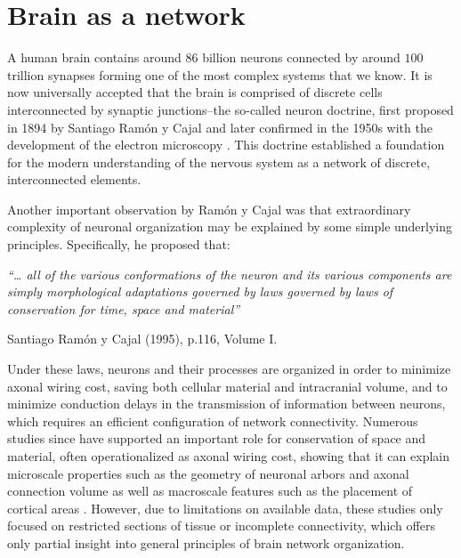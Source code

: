 \section{Brain as a network}
A human brain contains around $86$ billion neurons connected by around $100$ trillion synapses \citep{Williams1988,Andersen1992,Pelvig2008} forming one of the most complex systems that we know. It is now universally accepted that the brain is comprised of discrete cells interconnected by synaptic junctions--the so-called neuron doctrine, first proposed in 1894 by Santiago Ram\'{o}n y Cajal \citep{RamonyCajal1995} and later confirmed in the 1950s with the development of the electron microscopy \citep{DeRobertis1955}. This doctrine established a foundation for the modern understanding of the nervous system as a network of discrete, interconnected elements. 

Another important observation by Ram\'{o}n y Cajal was that extraordinary complexity of neuronal organization may be explained by some simple underlying principles. Specifically, he proposed that: 
\bigskip
\bigskip

\textit{``… all of the various conformations of the neuron and its various components are simply morphological adaptations governed by laws governed by laws of conservation for time, space and material''}

\hspace{7.5cm}Santiago Ram\'{o}n y Cajal (1995), p.116, Volume I. 
\bigskip

Under these laws, neurons and their processes are organized in order to minimize axonal wiring cost, saving both cellular material and intracranial volume, and to minimize conduction delays in the transmission of information between neurons, which requires an efficient configuration of network connectivity. Numerous studies since have supported an important role for conservation of space and material, often operationalized as axonal wiring cost, showing that it can explain microscale properties such as the geometry of neuronal arbors \citep{Cherniak1999} and axonal connection volume \citep{Chklovskii2002} as well as macroscale features such as the placement of cortical areas \citep{Cherniak2004}. However, due to limitations on available data, these studies only focused on restricted sections of tissue or incomplete connectivity, which offers only partial insight into general principles of brain network organization.  

